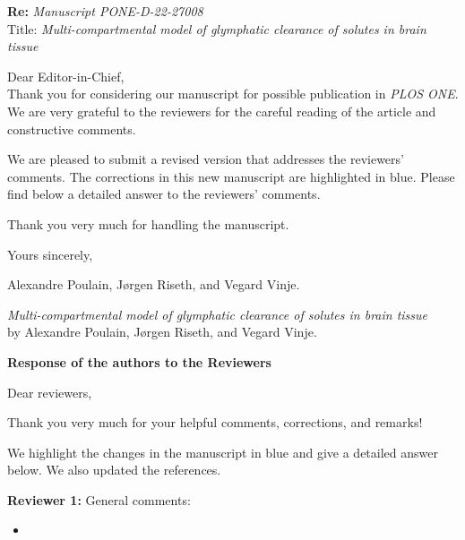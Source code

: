 \documentclass {letter}
\begin{document}
   \begin{letter}{ }
       \opening{ }

       
       \begin{center}
\noindent\textbf{Re:}  \textit{Manuscript PONE-D-22-27008} \\
Title: \textit{Multi-compartmental model of glymphatic clearance of solutes in brain tissue}
\end{center}

       Dear Editor-in-Chief,\\
       
Thank you for considering our manuscript for possible publication in  {\it PLOS ONE}. \\


We are very grateful to the reviewers for the careful reading of the article and constructive comments. 



We are pleased to submit a revised version that addresses the reviewers' comments. 
The corrections in this new manuscript are highlighted in blue. 
Please find below a detailed answer to the reviewers' comments.  



\noindent
Thank you very much for handling the manuscript.

Yours sincerely,
\\

\begin{flushright}
    Alexandre Poulain, Jørgen Riseth, and Vegard Vinje.
\end{flushright}
\newpage


\begin{center}
\textit{Multi-compartmental model of glymphatic clearance of solutes in brain tissue} \\
by Alexandre Poulain, Jørgen Riseth, and Vegard Vinje.
\end{center}
\vspace{0.3cm}

\centerline{\textbf{Response of the authors to the Reviewers}}

Dear reviewers, 

Thank you very much for your helpful comments, corrections, and remarks!

We highlight the changes in the manuscript in blue and give a detailed answer below. We also updated the references.

\bigskip
\textbf{Reviewer 1:}
General comments: 
\begin{itemize}
    \item 
\end{itemize}


\end{letter}
\end{document}
